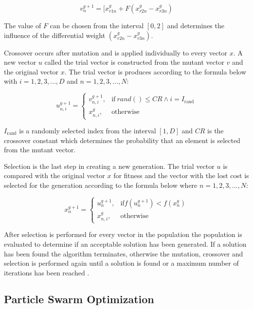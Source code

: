 \begin{equation}
v_{n}^{g+1} = [ x_{r1n}^{g} + F(x_{r2n}^{g} - x_{r3n}^{g})
\end{equation}

The value of $F$ can be chosen from the interval $[0,2]$ and determines the influence of the differential weight $(x_{r2n}^{g} - x_{r3n}^{g})$.

Crossover occurs after mutation and is applied individually to every vector $x$. A new vector $u$ called the trial vector is constructed from the mutant vector $v$ and the original vector $x$. The trial vector is produces according to the formula below with $i=1,2,3,...,D$ and $n=1,2,3,...,N$:

\begin{equation}
    u_{n,i}^{g+1} =
    \begin{cases}
      v_{n,i}^{g+1}, & \text{if}\ rand() \leq CR \wedge i = I_{\text{rand}} \\
      x_{n,i}^{g}, & \text{otherwise}
\end{cases}
\end{equation}

$I_{\text{rand}}$ is a randomly selected index from the interval $[1,D]$ and $CR$ is the crossover constant which determines the probability that an element is selected from the mutant vector.

Selection is the last step in creating a new generation. The trial vector $u$ is compared with the original vector $x$ for fitness and the vector with the lost cost is selected for the generation according to the formula below where $n=1,2,3,...,N$:

\begin{equation}
    x_{n}^{g+1} =
    \begin{cases}
      u_{n}^{g+1}, & \text{if} f(u_{n}^{g+1}) < f(x_{n}^{g}) \\
      x_{n,i}^{g}, & \text{otherwise}
\end{cases}
\end{equation}

After selection is performed for every vector in the population the population is evaluated to determine if an acceptable solution has been generated. If a solution has been found the algorithm terminates, otherwise the mutation, crossover and selection is performed again until a solution is found or a maximum number of iterations has been reached \cite{Storn1997}.

\subsection{Particle Swarm Optimization}

